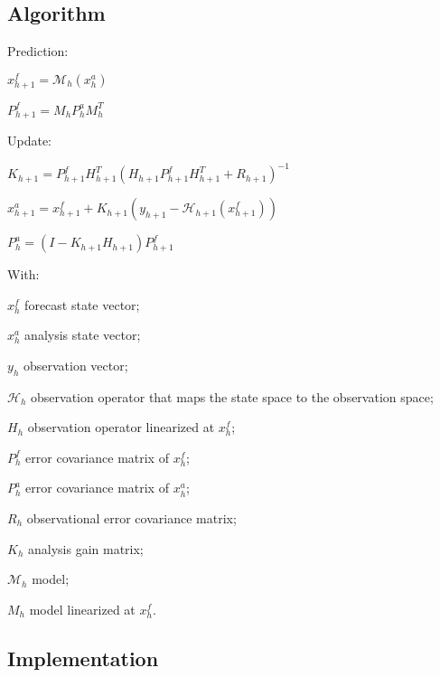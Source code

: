 \documentclass{tufte-book}
\begin{document}
\hypertarget{extended_kalman_filter_algorithm2}{}\subsection{\-Algorithm}\label{extended_kalman_filter_algorithm2}

\begin{DoxyEnumerate}
\item \-Prediction\-:
\begin{DoxyItemize}
\item $x_{h+1}^f = \mathcal{M}_{h}(x_{h}^a)$\par

\item $P_{h+1}^f = M_{h} P_{h}^a M_{h}^T $
\end{DoxyItemize}
\item \-Update\-:
\begin{DoxyItemize}
\item $K_{h+1} = P_{h+1}^fH_{h+1}^{T}(H_{h+1}P_{h+1}^fH_{h+1}^{T} + R_{h+1})^{-1}$\par

\item $x_{h+1}^a = x_{h+1}^f + K_{h+1}(y_{h+1} - \mathcal{H}_{h+1}(x_{h+1}^f))$\par

\item $P_h^a = (I - K_{h+1}H_{h+1})P_{h+1}^f$
\end{DoxyItemize}
\end{DoxyEnumerate}\-With\-: \par
 $x_h^f$ forecast state vector; \par
 $x_h^a$ analysis state vector; \par
 $y_h$ observation vector; \par
 $\mathcal{H}_h$ observation operator that maps the state space to the observation space; \par
 $H_h$ observation operator linearized at $x^f_h$; \par
 $P^f_h$ error covariance matrix of $x_h^f$; \par
 $P^a_h$ error covariance matrix of $x_h^a$; \par
 $R_h$ observational error covariance matrix; \par
 $K_h$ analysis gain matrix; \par
 $\mathcal{M}_h$ model; \par
 $M_h$ model linearized at $x^f_h$.

 \hypertarget{extended_kalman_filter_implementation}{}\subsection{\-Implementation}\label{extended_kalman_filter_implementation}
\end{document}
